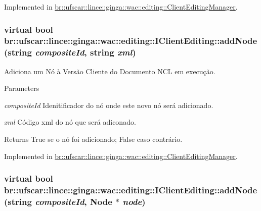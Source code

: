 Implemented in \hyperlink{classbr_1_1ufscar_1_1lince_1_1ginga_1_1wac_1_1editing_1_1ClientEditingManager_a53cb5ddc1e425c7f03c7aacff140223c}{br::ufscar::lince::ginga::wac::editing::ClientEditingManager}.

\hypertarget{classbr_1_1ufscar_1_1lince_1_1ginga_1_1wac_1_1editing_1_1IClientEditing_ad101947701dbbef3d365d92ae385ec46}{
\subsubsection[{addNode}]{\setlength{\rightskip}{0pt plus 5cm}virtual bool br::ufscar::lince::ginga::wac::editing::IClientEditing::addNode (string {\em compositeId}, \/  string {\em xml})}}
\label{classbr_1_1ufscar_1_1lince_1_1ginga_1_1wac_1_1editing_1_1IClientEditing_ad101947701dbbef3d365d92ae385ec46}


Adiciona um Nó à Versão Cliente do Documento NCL em execução. 


\begin{DoxyParams}{Parameters}
\item[{\em compositeId}]Idenitificador do nó onde este novo nó será adicionado. \item[{\em xml}]Código xml do nó que será adiconado. \end{DoxyParams}
\begin{DoxyReturn}{Returns}
True se o nó foi adicionado; False caso contrário. 
\end{DoxyReturn}


Implemented in \hyperlink{classbr_1_1ufscar_1_1lince_1_1ginga_1_1wac_1_1editing_1_1ClientEditingManager_aa7ddb3cd14fd26fe7e4edf8b3024fdb7}{br::ufscar::lince::ginga::wac::editing::ClientEditingManager}.

\hypertarget{classbr_1_1ufscar_1_1lince_1_1ginga_1_1wac_1_1editing_1_1IClientEditing_ad8662a9f157872a4cbe7ed0da9baf3fb}{
\subsubsection[{addNode}]{\setlength{\rightskip}{0pt plus 5cm}virtual bool br::ufscar::lince::ginga::wac::editing::IClientEditing::addNode (string {\em compositeId}, \/  Node $\ast$ {\em node})}}
\label{classbr_1_1ufscar_1_1lince_1_1ginga_1_1wac_1_1editing_1_1IClientEditing_ad8662a9f157872a4cbe7ed0da9baf3fb}


